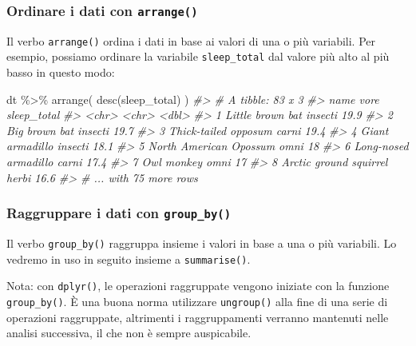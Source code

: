 \documentclass[
  11pt,
]{krantz}
\makeatletter
\newenvironment{Shaded}{\begin{snugshade}}{\end{snugshade}}
\newcommand{\CommentTok}[1]{\textcolor[rgb]{0.37,0.37,0.37}{\textit{#1}}}
\newcommand{\FunctionTok}[1]{\textcolor[rgb]{0,0,0}{#1}}
\newcommand{\NormalTok}[1]{#1}
\newcommand{\SpecialCharTok}[1]{\textcolor[rgb]{0,0,0}{#1}}
\newenvironment{kframe}{%
\medskip{}
\setlength{\fboxsep}{.8em}
 \def\at@end@of@kframe{}%
 \ifinner\ifhmode%
  \def\at@end@of@kframe{\end{minipage}}%
  \begin{minipage}{\columnwidth}%
 \fi\fi%
 \def\FrameCommand##1{\hskip\@totalleftmargin \hskip-\fboxsep
 \colorbox{shadecolor}{##1}\hskip-\fboxsep
     \hskip-\linewidth \hskip-\@totalleftmargin \hskip\columnwidth}%
 \MakeFramed {\advance\hsize-\width
   \@totalleftmargin\z@ \linewidth\hsize
   \@setminipage}}%
 {\par\unskip\endMakeFramed%
 \at@end@of@kframe}
\renewenvironment{Shaded}{\begin{kframe}}{\end{kframe}}
\theoremstyle{definition}
\theoremstyle{definition}
\theoremstyle{definition}
\theoremstyle{definition}
\theoremstyle{remark}
\makeatother
\begin{document}
\hypertarget{ordinare-i-dati-con-arrange}{%
\subsubsection{\texorpdfstring{Ordinare i dati con \texttt{arrange()}}{Ordinare i dati con arrange()}}\label{ordinare-i-dati-con-arrange}}

Il verbo \texttt{arrange()} ordina i dati in base ai valori di una o più variabili. Per esempio, possiamo ordinare la variabile \texttt{sleep\_total} dal valore più alto al più basso in questo modo:

\begin{Shaded}
\begin{Highlighting}[]
\NormalTok{dt }\SpecialCharTok{\%\textgreater{}\%} 
  \FunctionTok{arrange}\NormalTok{(}
    \FunctionTok{desc}\NormalTok{(sleep\_total)}
\NormalTok{  )}
\CommentTok{\#\textgreater{} \# A tibble: 83 x 3}
\CommentTok{\#\textgreater{}   name                   vore    sleep\_total}
\CommentTok{\#\textgreater{}   \textless{}chr\textgreater{}                  \textless{}chr\textgreater{}         \textless{}dbl\textgreater{}}
\CommentTok{\#\textgreater{} 1 Little brown bat       insecti        19.9}
\CommentTok{\#\textgreater{} 2 Big brown bat          insecti        19.7}
\CommentTok{\#\textgreater{} 3 Thick{-}tailed opposum   carni          19.4}
\CommentTok{\#\textgreater{} 4 Giant armadillo        insecti        18.1}
\CommentTok{\#\textgreater{} 5 North American Opossum omni           18  }
\CommentTok{\#\textgreater{} 6 Long{-}nosed armadillo   carni          17.4}
\CommentTok{\#\textgreater{} 7 Owl monkey             omni           17  }
\CommentTok{\#\textgreater{} 8 Arctic ground squirrel herbi          16.6}
\CommentTok{\#\textgreater{} \# ... with 75 more rows}
\end{Highlighting}
\end{Shaded}

\hypertarget{raggruppare-i-dati-con-group_by}{%
\subsubsection{\texorpdfstring{Raggruppare i dati con \texttt{group\_by()}}{Raggruppare i dati con group\_by()}}\label{raggruppare-i-dati-con-group_by}}

Il verbo \texttt{group\_by()} raggruppa insieme i valori in base a una o più variabili. Lo vedremo in uso in seguito insieme a \texttt{summarise()}.

Nota: con \texttt{dplyr()}, le operazioni raggruppate vengono iniziate con la funzione \texttt{group\_by()}. È una buona norma utilizzare \texttt{ungroup()} alla fine di una serie di operazioni raggruppate, altrimenti i raggruppamenti verranno mantenuti nelle analisi successiva, il che non è sempre auspicabile.
\end{document}
